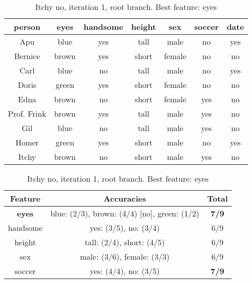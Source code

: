 \begin{table}[h!]
  \centering
  \begin{tabular}{cccccc|c}
    \toprule
    person      & eyes  & handsome & height & sex    & soccer & date\\
    \midrule
    Apu         & blue  & yes      & tall   & male   & no     & yes \\
    Bernice     & brown & yes      & short  & female & no     & no  \\
    Carl        & blue  & no       & tall   & male   & no     & yes \\
    Doris       & green & yes      & short  & female & no     & no  \\
    Edna        & brown & no       & short  & female & yes    & no  \\
    Prof. Frink & brown & yes      & tall   & male   & yes    & no  \\
    Gil         & blue  & no       & tall   & male   & yes    & no  \\
    Homer       & green & yes      & short  & male   & no     & yes \\
    Itchy       & brown & no       & short  & male   & yes    & no  \\
    \bottomrule
  \end{tabular}

  \vspace{.5cm}

  \begin{tabular}{ccc}
    \toprule
    Feature      & Accuracies                                    & Total\\
    \midrule
    \textbf{eyes} & blue: (2/3), brown: (4/4) [no], green: (1/2) & \textbf{7/9}\\
    handsome      & yes: (3/5), no: (3/4)                        & 6/9\\
    height        & tall: (2/4), short: (4/5)                    & 6/9\\
    sex           & male: (3/6), female: (3/3)                   & 6/9\\
    soccer        & yes: (4/4), no: (3/5)                        & \textbf{7/9}\\
    \bottomrule
  \end{tabular}
  \caption*{Itchy no, iteration 1, root branch. Best feature: eyes}
\end{table}

